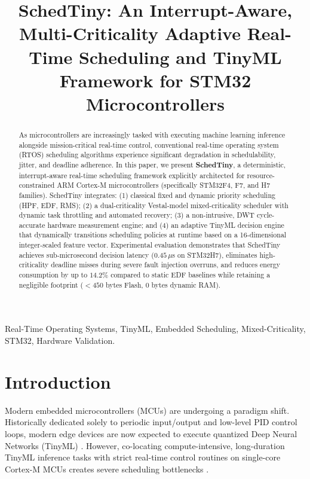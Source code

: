 \documentclass[conference]{IEEEtran}
\begin{document}
\title{SchedTiny: An Interrupt-Aware, Multi-Criticality Adaptive Real-Time Scheduling and TinyML Framework for STM32 Microcontrollers}

\author{
}

\maketitle

\begin{abstract}
As microcontrollers are increasingly tasked with executing machine learning inference alongside mission-critical real-time control, conventional real-time operating system (RTOS) scheduling algorithms experience significant degradation in schedulability, jitter, and deadline adherence. In this paper, we present \textbf{SchedTiny}, a deterministic, interrupt-aware real-time scheduling framework explicitly architected for resource-constrained ARM Cortex-M microcontrollers (specifically STM32F4, F7, and H7 families). SchedTiny integrates: (1) classical fixed and dynamic priority scheduling (HPF, EDF, RMS); (2) a dual-criticality Vestal-model mixed-criticality scheduler with dynamic task throttling and automated recovery; (3) a non-intrusive, DWT cycle-accurate hardware measurement engine; and (4) an adaptive TinyML decision engine that dynamically transitions scheduling policies at runtime based on a 16-dimensional integer-scaled feature vector. Experimental evaluation demonstrates that SchedTiny achieves sub-microsecond decision latency ($0.45\,\mu$s on STM32H7), eliminates high-criticality deadline misses during severe fault injection overruns, and reduces energy consumption by up to $14.2\%$ compared to static EDF baselines while retaining a negligible footprint ($<450$ bytes Flash, $0$ bytes dynamic RAM).
\end{abstract}

\begin{IEEEkeywords}
Real-Time Operating Systems, TinyML, Embedded Scheduling, Mixed-Criticality, STM32, Hardware Validation.
\end{IEEEkeywords}

\section{Introduction}
Modern embedded microcontrollers (MCUs) are undergoing a paradigm shift. Historically dedicated solely to periodic input/output and low-level PID control loops, modern edge devices are now expected to execute quantized Deep Neural Networks (TinyML) \cite{banbury2020benchmarking, david2021tensorflow}. However, co-locating compute-intensive, long-duration TinyML inference tasks with strict real-time control routines on single-core Cortex-M MCUs creates severe scheduling bottlenecks \cite{scheduling2024tinyml}.
\end{document}
